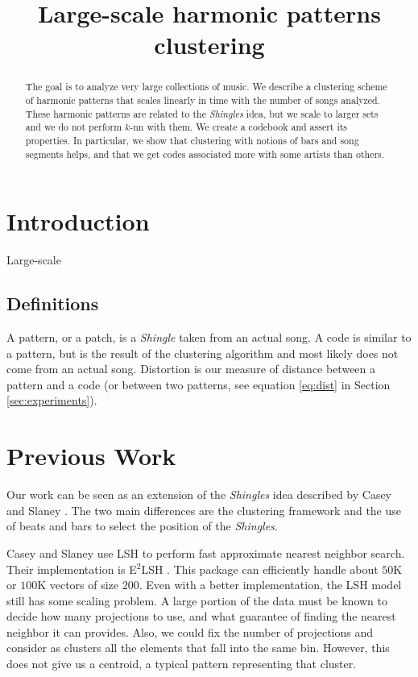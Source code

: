 \documentclass{article}
\title{Large-scale harmonic patterns clustering}
\begin{document}
%
\maketitle
%
\begin{abstract}
The goal is to analyze very large collections of music. We describe
a clustering scheme of harmonic patterns that scales linearly in time
with the number of songs analyzed. These harmonic patterns are related
to the \textit{Shingles} idea, but we scale to larger sets and we do not
perform $k$-nn with them. We create a codebook and assert
its properties. In particular, we show that clustering with notions of
bars and song segments helps, and that we get codes associated more
with some artists than others.
\end{abstract}
%
\section{Introduction}\label{sec:introduction}


Large-scale \cite{Bertin-Mahieux2008}

\subsection{Definitions}
A pattern, or a patch, is a \textit{Shingle} taken from an actual song.
A code is similar to a pattern, but is the result of the clustering
algorithm and most likely does not come from an actual song.
Distortion is our measure of distance between a pattern and a code
(or between two patterns, see equation \ref{eq:dist} in Section 
\ref{sec:experiments}).


\section{Previous Work}\label{sec:prevwork}
Our work can be seen as an extension of the \textit{Shingles} idea
described by Casey and Slaney \cite{Casey2006,Casey2007,Casey2008}.
The two main differences are the clustering framework and the use of
beats and bars to select the position of the \textit{Shingles}.

Casey and Slaney \cite{Casey2006} use LSH \cite{Datar2004} to perform
fast approximate nearest neighbor search. Their implementation is E$^2$LSH
\cite{E2LSH}. This package can efficiently handle about $50$K or $100$K
vectors of size $200$. Even with a better implementation, the LSH
model still has some scaling problem. A large portion of the data
must be known to decide how many projections to use, and what guarantee
of finding the nearest neighbor it can provides. Also, we could fix the
number of projections and consider as clusters all the elements that
fall into the same bin. However, this does not give us a centroid, a
typical pattern representing that cluster.
\end{document}
